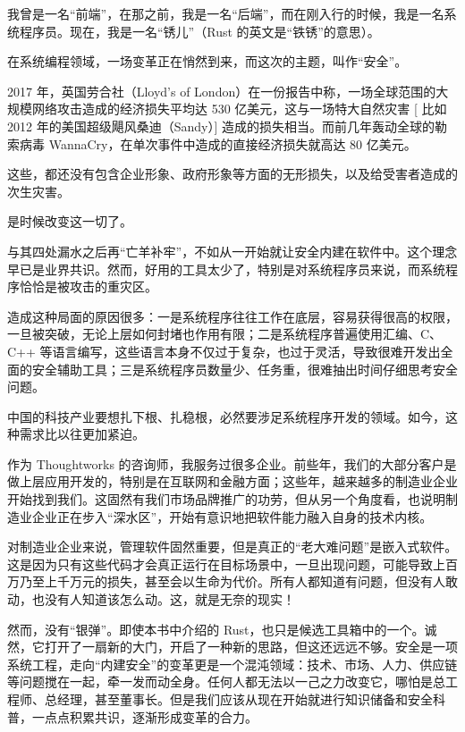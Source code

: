 
我曾是一名“前端”，在那之前，我是一名“后端”，而在刚入行的时候，我是一名系统程序员。现在，我是一名“锈儿”（Rust 的英文是“铁锈”的意思）。

在系统编程领域，一场变革正在悄然到来，而这次的主题，叫作“安全”。

2017 年，英国劳合社（Lloyd's of London）在一份报告中称，一场全球范围的大规模网络攻击造成的经济损失平均达 530 亿美元，这与一场特大自然灾害 [ 比如 2012 年的美国超级飓风桑迪（Sandy）] 造成的损失相当。而前几年轰动全球的勒索病毒 WannaCry，在单次事件中造成的直接经济损失就高达 80 亿美元。

这些，都还没有包含企业形象、政府形象等方面的无形损失，以及给受害者造成的次生灾害。

是时候改变这一切了。

与其四处漏水之后再“亡羊补牢”，不如从一开始就让安全内建在软件中。这个理念早已是业界共识。然而，好用的工具太少了，特别是对系统程序员来说，而系统程序恰恰是被攻击的重灾区。

造成这种局面的原因很多：一是系统程序往往工作在底层，容易获得很高的权限，一旦被突破，无论上层如何封堵也作用有限；二是系统程序普遍使用汇编、C、C++ 等语言编写，这些语言本身不仅过于复杂，也过于灵活，导致很难开发出全面的安全辅助工具；三是系统程序员数量少、任务重，很难抽出时间仔细思考安全问题。

中国的科技产业要想扎下根、扎稳根，必然要涉足系统程序开发的领域。如今，这种需求比以往更加紧迫。

作为 Thoughtworks 的咨询师，我服务过很多企业。前些年，我们的大部分客户是做上层应用开发的，特别是在互联网和金融方面；这些年，越来越多的制造业企业开始找到我们。这固然有我们市场品牌推广的功劳，但从另一个角度看，也说明制造业企业正在步入“深水区”，开始有意识地把软件能力融入自身的技术内核。

对制造业企业来说，管理软件固然重要，但是真正的“老大难问题”是嵌入式软件。这是因为只有这些代码才会真正运行在目标场景中，一旦出现问题，可能导致上百万乃至上千万元的损失，甚至会以生命为代价。所有人都知道有问题，但没有人敢动，也没有人知道该怎么动。这，就是无奈的现实！

然而，没有“银弹”。即使本书中介绍的 Rust，也只是候选工具箱中的一个。诚然，它打开了一扇新的大门，开启了一种新的思路，但这还远远不够。安全是一项系统工程，走向“内建安全”的变革更是一个混沌领域：技术、市场、人力、供应链等问题搅在一起，牵一发而动全身。任何人都无法以一己之力改变它，哪怕是总工程师、总经理，甚至董事长。但是我们应该从现在开始就进行知识储备和安全科普，一点点积累共识，逐渐形成变革的合力。

